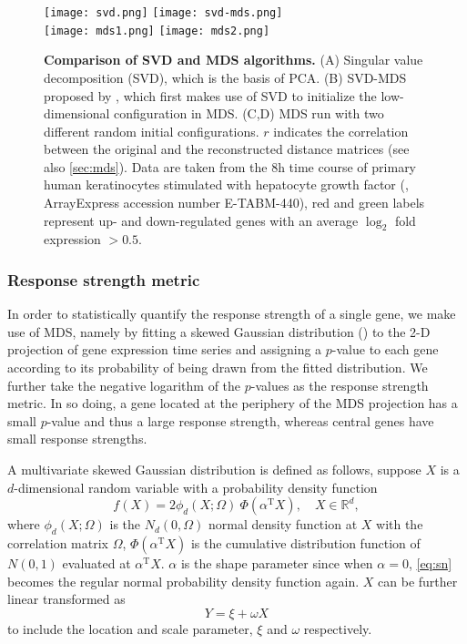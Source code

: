 \begin{figure}[!ht]
\centering
\texttt{[image: svd.png]}
\texttt{[image: svd-mds.png]}\\
\texttt{[image: mds1.png]}
\texttt{[image: mds2.png]}
\caption[Performance of the MDS algorithm]{
{\bf Comparison of SVD and MDS algorithms.}
(A) Singular 
value decomposition (SVD), which is the basis of PCA. (B) SVD-MDS
proposed by \citealp{Becavin2011}, which first makes use of
SVD to initialize the low-dimensional configuration in MDS.
(C,D) MDS run with two different random initial 
configurations. $r$ indicates the correlation between the
original and the reconstructed distance matrices (see also
\ref{sec:mds}). 
Data are taken from the 8h time course of primary human keratinocytes 
stimulated with hepatocyte growth factor (\cite{Busch2008}, 
ArrayExpress accession number E-TABM-440),
red and green labels represent up- and 
down-regulated genes with an average $\log_2$ fold expression 
$> 0.5$. }
\label{fig:svd-mds}
\end{figure}

\subsubsection{Response strength metric}
\label{sec:response_strength}
In order to statistically quantify the response strength of 
a single gene, we make use of 
MDS, namely by fitting a skewed Gaussian distribution (\citealp{Azzalini2003}) 
to the 2-D projection
of gene expression time series and assigning a $p$-value to each
gene according to its probability of being drawn from the fitted distribution.
We further take the negative logarithm of the $p$-values as the response
strength metric. In so doing, a gene located at the periphery of the MDS
projection has a small $p$-value and thus a large response strength, whereas
central genes have small response strengths.

A multivariate skewed Gaussian distribution is defined as follows, suppose
$X$ is a $d$-dimensional random variable with a probability density function
\begin{equation}
f(X) = 2 \phi_d (X;\Omega) \ \Phi(\alpha^{\mathrm{T}} X), \quad X \in \mathbb{R}^d,
\label{eq:sn}
\end{equation}
where $\phi_d(X;\Omega)$ is the $N_d(0,\Omega)$ normal density function at $X$
with the correlation matrix $\Omega$, $\Phi(\alpha^{\mathrm{T}} X)$ is the 
cumulative distribution function of $N(0,1)$ evaluated at $\alpha^{\mathrm{T}} X$.
$\alpha$ is the shape parameter since when $\alpha=0$, \ref{eq:sn} becomes
the regular normal probability density function again. $X$ can be further
linear transformed as
\[
Y = \xi + \omega X
\]
to include the location and scale parameter, $\xi$ and $\omega$ respectively.

